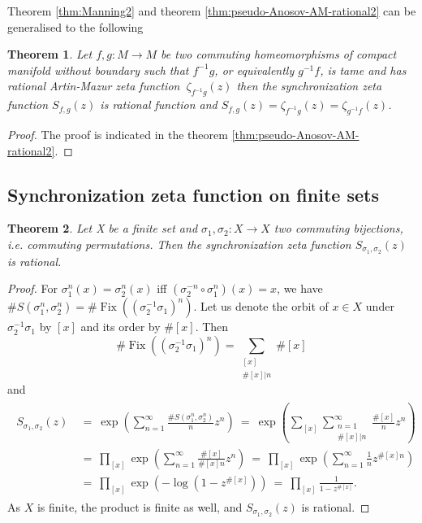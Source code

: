 \documentclass[oneside]{amsart}
\def\Fix{\operatorname{Fix}}
\newtheorem{thm}{Theorem}
\begin{document}
Theorem \ref{thm:Manning2} and theorem \ref{thm:pseudo-Anosov-AM-rational2} can be generalised to the following
\begin{thm}\label{thm:pseudo-Anosov-AM-rational3}
 Let $f,g: M \to M$ be two commuting homeomorphisms of  compact manifold without boundary
 such that $f^{-1}g$, or equivalently  $g^{-1}f$,  is tame and has rational Artin-Mazur zeta function
 $\ \zeta_{f^{-1}g}(z) $ then the synchronization zeta function  $S_{f,g}(z)$ is rational function and
 $S_{f,g}(z) =  \zeta_{f^{-1}g}(z)=  \zeta_{g^{-1}f}(z) $.
 \end{thm}
\begin{proof}
 The proof is indicated in the theorem \ref{thm:pseudo-Anosov-AM-rational2}.
\end{proof}




\subsection{Synchronization zeta function on finite sets}

\begin{thm} \label{thm:synchronization-commuting-permutations}
  Let X be a finite set and $\sigma_1, \sigma_2: X \to X$ two commuting bijections,
  i.e. commuting permutations.
  Then the synchronization zeta function $S_{\sigma_1, \sigma_2}(z)$ is rational.
\end{thm}
\begin{proof}
  For $\sigma_1^n(x) = \sigma_2^n(x)$ iff $(\sigma_2^{-n} \circ \sigma_1^n)(x) = x$, we have
  $\# S(\sigma_1^n, \sigma_2^n) = \# \Fix\left((\sigma_2^{-1}\sigma_1)^n\right)$.
  Let us denote the orbit of $x \in X$ under $\sigma_2^{-1}\sigma_1$ by $[x]$ and its order by $\#[x]$.
  Then
  \begin{equation*}
    \# \Fix\left((\sigma_2^{-1}\sigma_1)^n\right) = \sum_{\substack{[x] \\ \#[x] | n}} \#[x]
  \end{equation*}
  and
  \begin{align} \label{eq:finite-set-synchrozniation}
  \begin{split}
    S_{\sigma_1, \sigma_2}(z) \ &= \ \exp \left( \sum_{n=1}^\infty \frac{\# S(\sigma_1^n, \sigma_2^n)}{n} z^n \right)
      \ = \ \exp \left( \sum_{[x]} \sum_{\substack{n=1 \\ \#[x]|n}}^\infty \frac{\#[x]}{n} z^n \right) \\
    &= \ \prod_{[x]} \exp \left( \sum_{n=1}^\infty \frac{\#[x]}{\#[x]n} z^n \right)
      \ = \ \prod_{[x]} \exp \left( \sum_{n=1}^\infty \frac{1}{n} z^{\#[x]n} \right) \\
    &= \ \prod_{[x]} \exp \left( -\log \left( 1 - z^{\#[x]} \right)\right)
      \ = \ \prod_{[x]} \frac{1}{1 - z^{\#[x]}}.
  \end{split}
  \end{align}
  As $X$ is finite, the product is finite as well, and $S_{\sigma_1, \sigma_2}(z)$ is rational.
\end{proof}
\end{document}

